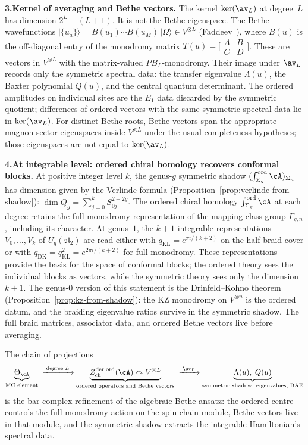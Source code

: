 \begin{remark}
\textbf{3.\@ Kernel of averaging and Bethe vectors.}
The kernel $\ker(\av_L)$ at degree~$L$ has dimension
$2^L - (L + 1)$.
It is not the Bethe eigenspace. The Bethe wavefunctions
$|\{u_a\}\rangle = B(u_1) \cdots B(u_M)\,|\Omega\rangle
\in V^{\otimes L}$
(Faddeev~\cite{Faddeev96}), where $B(u)$ is the off-diagonal
entry of the monodromy matrix
$T(u) = \bigl[\begin{smallmatrix} A & B \\ C & D
\end{smallmatrix}\bigr]$.
These are vectors in $V^{\otimes L}$ with the matrix-valued
$PB_L$-monodromy. Their image under $\av_L$ records only the
symmetric spectral data: the transfer eigenvalue $\Lambda(u)$, the
Baxter polynomial $Q(u)$, and the central quantum determinant. The
ordered amplitudes on individual sites are the $E_1$ data discarded
by the symmetric quotient; differences of ordered vectors with the
same symmetric spectral data lie in $\ker(\av_L)$. For distinct Bethe
roots, Bethe vectors span the appropriate magnon-sector eigenspaces
inside $V^{\otimes L}$ under the usual completeness hypotheses; those
eigenspaces are not equal to $\ker(\av_L)$.

\textbf{4.\@ At integrable level: ordered chiral homology
recovers conformal blocks.}
At positive integer level $k$, the genus-$g$ symmetric shadow
$(\int_{\Sigma_g}^{\mathrm{ord}} \cA)_{\Sigma_n}$ has
dimension given by the Verlinde formula
(Proposition~\ref{prop:verlinde-from-shadow}):
$\dim Q_g = \sum_{j=0}^{k} S_{0j}^{2-2g}$.
The ordered chiral homology
$\int_{\Sigma_g}^{\mathrm{ord}} \cA$ at each degree retains
the full monodromy representation of the mapping class group
$\Gamma_{g,n}$, including its character. At genus~$1$, the
$k+1$ integrable representations $V_0, \ldots, V_k$ of
$U_q(\mathfrak{sl}_2)$ are read either with
$q_{\mathrm{KL}}=e^{\pi i/(k+2)}$ on the half-braid cover or with
$q_{\mathrm{DK}}=q_{\mathrm{KL}}^2=e^{2\pi i/(k+2)}$ for full
monodromy. These representations provide the basis for the space of
conformal blocks; the
ordered theory sees the individual blocks as vectors, while
the symmetric theory sees only the dimension $k+1$.
The genus-$0$ version of this statement is the Drinfeld--Kohno
theorem (Proposition~\ref{prop:kz-from-shadow}): the KZ monodromy
on $V^{\otimes n}$ is the ordered datum, and the braiding
eigenvalue ratios survive in the symmetric shadow. The full braid
matrices, associator data, and ordered Bethe vectors live before
averaging.

The chain of projections
\[
\underbrace{\Theta_\cA}_{\text{MC element}}
\;\xrightarrow{\;\mathrm{degree}\;L\;}
\underbrace{Z_{\mathrm{ch}}^{\mathrm{der,ord}}(\cA)
\curvearrowright V^{\otimes L}}_{\text{ordered operators and
Bethe vectors}}
\;\xrightarrow{\;\av_L\;}
\underbrace{\Lambda(u),\; Q(u)}_{\text{symmetric shadow:
eigenvalues, BAE}}
\]
is the bar-complex refinement of the algebraic Bethe ansatz:
the ordered centre controls the full monodromy action on the
spin-chain module, Bethe vectors live in that module, and the
symmetric shadow extracts the integrable Hamiltonian's spectral data.
\end{remark}

